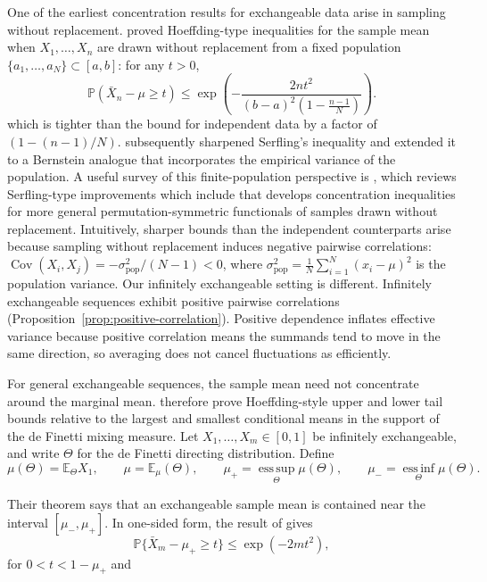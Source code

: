 \documentclass[11pt]{article}
\DeclareMathOperator{\Cov}{Cov}
\newcommand{\E}{\mathbb{E}}
\newcommand{\Pbb}{\mathbb{P}}
\theoremstyle{definition}
\theoremstyle{remark}
\begin{document}
One of the earliest concentration results for exchangeable data arise in sampling without replacement. \citet{serfling1974probability} proved Hoeffding-type inequalities for the sample mean when $X_1,\dots, X_n$ are drawn without replacement from a fixed population $\{a_1,\dots, a_N\} \subset [a,b]$: for any $t>0$,
\begin{equation}\label{eq:serfling}
  \Pbb\!\left(\bar{X}_n - \mu \ge t\right)
  \le \exp\!\left(-\frac{2nt^2}{(b-a)^2\left(1-\frac{n-1}{N}\right)}\right).
\end{equation}
which is tighter than the bound for independent data by a factor of $(1-(n-1)/N)$. \citet{bardenet2015concentration} subsequently sharpened Serfling's inequality and extended it to a Bernstein analogue that incorporates the empirical variance of the population. A useful survey of this finite-population perspective is \citet{tolstikhin2017concentration}, which reviews Serfling-type improvements which include \citet{el2009transductive} that develops concentration inequalities for more general permutation-symmetric functionals of samples drawn without replacement. Intuitively, sharper bounds than the independent counterparts arise because sampling without replacement induces
{negative} pairwise correlations:
$\Cov(X_i, X_j) = -\sigma^2_{\mathrm{pop}}/(N-1) < 0$, where $\sigma^2_{\mathrm{pop}} = \frac{1}{N} \sum_{i=1}^N(x_i-\mu)^2$ is the population variance. Our infinitely exchangeable setting is different. Infinitely exchangeable sequences exhibit positive pairwise correlations (Proposition~\ref{prop:positive-correlation}). Positive dependence inflates effective variance because positive correlation means the summands tend to move in the same direction, so averaging does not cancel fluctuations as efficiently. 

For general exchangeable sequences, the sample mean need not concentrate around the marginal mean. \citet{gottschling2026hoeffding} therefore prove Hoeffding-style upper and lower tail bounds relative to the largest and smallest conditional means in the support of the de Finetti mixing measure. Let $X_1,\ldots,X_m\in[0,1]$ be infinitely exchangeable, and write $\Theta$ for the de Finetti directing distribution.  Define
\[
    \mu(\Theta)=\E_\Theta X_1,
    \qquad
    \mu=\E_\mu(\Theta),
    \qquad
    \mu_+=\operatorname*{ess\,sup}_{\Theta}\mu(\Theta),
    \qquad
    \mu_- =\operatorname*{ess\,inf}_{\Theta}\mu(\Theta).
\]

Their theorem says that an exchangeable sample mean is contained near the interval $[\mu_-,\mu_+]$. In one-sided form, the result of \citet{gottschling2026hoeffding} gives
\[
    \Pbb\{\bar X_m-\mu_+\ge t\}\le \exp(-2mt^2),
\]
for $0<t<1-\mu_+$ and 
\end{document}
